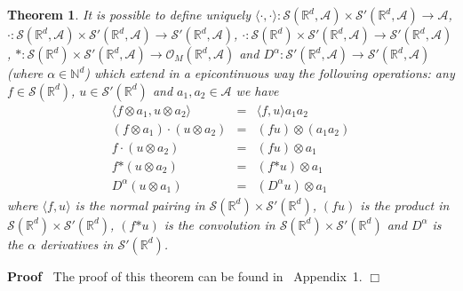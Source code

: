 \documentclass{article}
\newcommand{\asterisk}{\mathord{*}}
\newenvironment{proof}{\noindent\textbf{Proof\ }}{\hspace*{\fill}$\Box$\medskip}
\newtheorem{theorem}{Theorem}
\begin{document}
\begin{theorem}
  It is possible to define uniquely $\langle \cdot, \cdot \rangle :
  \mathcal{S} (\mathbb{R}^d, \mathcal{A}) \times \mathcal{S}' (\mathbb{R}^d,
  \mathcal{A}) \rightarrow \mathcal{A}$, $\cdot : \mathcal{S} (\mathbb{R}^d,
  \mathcal{A}) \times \mathcal{S}' (\mathbb{R}^d, \mathcal{A}) \rightarrow
  \mathcal{S}' (\mathbb{R}^d, \mathcal{A})$, $\cdot : \mathcal{S}
  (\mathbb{R}^d) \times \mathcal{S}' (\mathbb{R}^d, \mathcal{A}) \rightarrow
  \mathcal{S}' (\mathbb{R}^d, \mathcal{A})$, $\asterisk : \mathcal{S}
  (\mathbb{R}^d) \times \mathcal{S}' (\mathbb{R}^d, \mathcal{A}) \rightarrow
  \mathcal{O}_M (\mathbb{R}^d, \mathcal{A})$ and $D^{\alpha} : \mathcal{S}'
  (\mathbb{R}^d, \mathcal{A}) \rightarrow \mathcal{S}' (\mathbb{R}^d,
  \mathcal{A})$ (where $\alpha \in \mathbb{N}^d$) which extend in a
  epicontinuous way the following operations: any $f \in \mathcal{S}
  (\mathbb{R}^d)$, $u \in \mathcal{S}' (\mathbb{R}^d)$ and $a_1, a_2 \in
  \mathcal{A}$ we have
  \[ \begin{array}{rll}
       \langle f \otimes a_1, u \otimes a_2 \rangle & = & \langle f, u \rangle
       a_1 a_2\\
       (f \otimes a_1) \cdot (u \otimes a_2) & = & (f u) \otimes (a_1 a_2)\\
       f \cdot (u \otimes a_2) & = & (f u) \otimes a_1\\
       f \asterisk (u \otimes a_2) & = & (f \asterisk u) \otimes a_1\\
       D^{\alpha} (u \otimes a_1) & = & (D^{\alpha} u) \otimes a_1
     \end{array} \]
  where $\langle f, u \rangle$ is the normal pairing in $\mathcal{S}
  (\mathbb{R}^d) \times \mathcal{S}' (\mathbb{R}^d)$, $(f u)$ is the product
  in $\mathcal{S} (\mathbb{R}^d) \times \mathcal{S}' (\mathbb{R}^d)$, $(f
  \asterisk u)$ is the convolution in $\mathcal{S} (\mathbb{R}^d) \times
  \mathcal{S}' (\mathbb{R}^d)$ and $D^{\alpha}$ is the $\alpha$ derivatives in
  $\mathcal{S}' (\mathbb{R}^d)$.
\end{theorem}

\begin{proof}
  The proof of this theorem can be found in~{\cite{Amann2019}} Appendix~1.
\end{proof}
\end{document}
